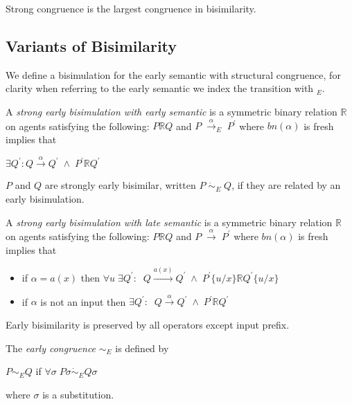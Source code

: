 \begin{proposition}
  Strong congruence is the largest congruence in bisimilarity.
\end{proposition}

\subsection{Variants of Bisimilarity}

We define a bisimulation for the early semantic with structural congruence, for clarity when referring to the early semantic we index the transition with $ _{E}$. 
\begin{definition}
  A \emph{strong early bisimulation with early semantic} is a symmetric binary relation $\mathbb{R}$ on agents satisfying the following: $P\mathbb{R} Q$ and $P\; \xrightarrow{\alpha}_{E}\; P^{'}$ where $bn(\alpha)$ is fresh implies that
  \begin{center}
    $\exists Q^{'}: Q\xrightarrow{\alpha}Q^{'}\; \wedge\; P^{'}\mathbb{R}Q^{'}$
  \end{center}
  $P$ and $Q$ are strongly early bisimilar, written $P\; \dot{\sim}_{E}\; Q$, if they are related by an early bisimulation.
\end{definition}

\begin{definition}
  A \emph{strong early bisimulation with late semantic} is a symmetric binary relation $\mathbb{R}$ on agents satisfying the following: $P\mathbb{R} Q$ and $P\; \xrightarrow{\alpha}\; P^{'}$ where $bn(\alpha)$ is fresh implies that
  \begin{itemize}
    \item
      if $\alpha=a(x)$ then $\forall u\; \exists Q^{'}:\;\; Q\xrightarrow{a(x)}Q^{'}\; \wedge\; P^{'}\{u/x\}\mathbb{R}Q^{'}\{u/x\}$
    \item
      if $\alpha$ is not an input then $\exists Q^{'}:\;\; Q\xrightarrow{\alpha}Q^{'}\; \wedge\; P^{'}\mathbb{R}Q^{'}$
  \end{itemize}
\end{definition}

\begin{proposition}
  Early bisimilarity is preserved by all operators except input prefix. 
\end{proposition}


\begin{definition}
  The \emph{early congruence} $\sim_{E}$ is defined by
  \begin{center}
    $P\sim_{E} Q$ if $\forall \sigma\; P\sigma \dot{\sim}_{E} Q\sigma$
  \end{center}
  where $\sigma$ is a substitution.
\end{definition}

